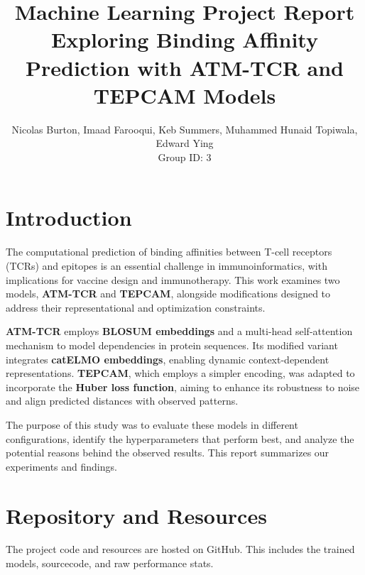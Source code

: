 \documentclass[11pt,a4paper]{article}
\title{
    Machine Learning Project Report \\ 
    \large Exploring Binding Affinity Prediction with ATM-TCR and TEPCAM Models
}
\author{
    Nicolas Burton, Imaad Farooqui, Keb Summers, Muhammed Hunaid Topiwala, Edward Ying \\ 
    Group ID: 3
}
\date{}
\begin{document}
\maketitle

\section{Introduction}
The computational prediction of binding affinities between T-cell receptors (TCRs) and epitopes is an essential challenge in immunoinformatics, with implications for vaccine design and immunotherapy. This work examines two models, \textbf{ATM-TCR} and \textbf{TEPCAM}, alongside modifications designed to address their representational and optimization constraints.

\bigskip

\textbf{ATM-TCR} employs \textbf{BLOSUM embeddings} and a multi-head self-attention mechanism to model dependencies in protein sequences. Its modified variant integrates \textbf{catELMO embeddings}, enabling dynamic context-dependent representations. \textbf{TEPCAM}, which employs a simpler encoding, was adapted to incorporate the \textbf{Huber loss function}, aiming to enhance its robustness to noise and align predicted distances with observed patterns.

\bigskip

The purpose of this study was to evaluate these models in different configurations, identify the hyperparameters that perform best, and analyze the potential reasons behind the observed results. This report summarizes our experiments and findings.

\section{Repository and Resources}
The project code and resources are hosted on GitHub. This includes the trained models, sourcecode, and raw performance stats.
\end{document}
